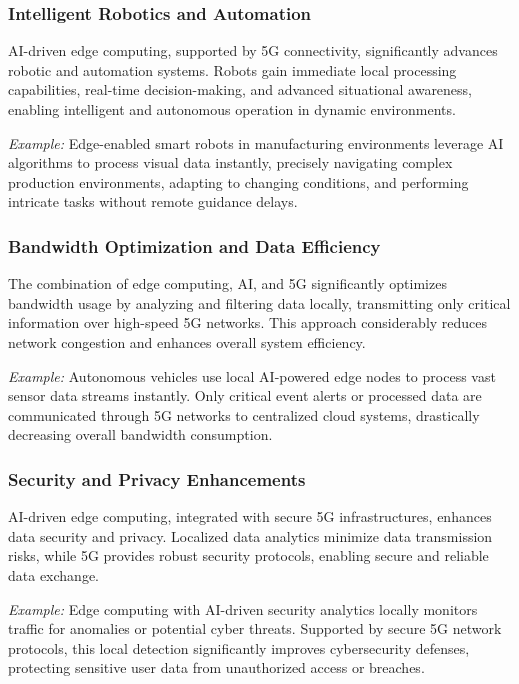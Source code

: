 \documentclass[runningheads]{llncs}
\begin{document}
\subsubsection{Intelligent Robotics and Automation}
AI-driven edge computing, supported by 5G connectivity, significantly advances robotic and automation systems. Robots gain immediate local processing capabilities, real-time decision-making, and advanced situational awareness, enabling intelligent and autonomous operation in dynamic environments.

\textit{Example:} Edge-enabled smart robots in manufacturing environments leverage AI algorithms to process visual data instantly, precisely navigating complex production environments, adapting to changing conditions, and performing intricate tasks without remote guidance delays.

\subsubsection{Bandwidth Optimization and Data Efficiency}
The combination of edge computing, AI, and 5G significantly optimizes bandwidth usage by analyzing and filtering data locally, transmitting only critical information over high-speed 5G networks. This approach considerably reduces network congestion and enhances overall system efficiency.

\textit{Example:} Autonomous vehicles use local AI-powered edge nodes to process vast sensor data streams instantly. Only critical event alerts or processed data are communicated through 5G networks to centralized cloud systems, drastically decreasing overall bandwidth consumption.

\subsubsection{Security and Privacy Enhancements}
AI-driven edge computing, integrated with secure 5G infrastructures, enhances data security and privacy. Localized data analytics minimize data transmission risks, while 5G provides robust security protocols, enabling secure and reliable data exchange.

\textit{Example:} Edge computing with AI-driven security analytics locally monitors traffic for anomalies or potential cyber threats. Supported by secure 5G network protocols, this local detection significantly improves cybersecurity defenses, protecting sensitive user data from unauthorized access or breaches.
\end{document}

